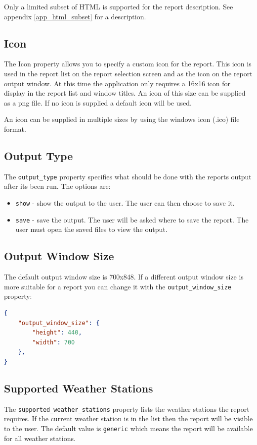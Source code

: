\documentclass[a4paper,10pt]{book}
\begin{document}
Only a limited subset of HTML is supported for the report description. See appendix \ref{app_html_subset} for a description.

\subsection{Icon}
The Icon property allows you to specify a custom icon for the report. This icon is used in the report list on the report selection screen and as the icon on the report output window. At this time the application only requires a 16x16 icon for display in the report list and window titles. An icon of this size can be supplied as a png file. If no icon is supplied a default icon will be used.

An icon can be supplied in multiple sizes by using the windows icon (.ico) file format.

\subsection{Output Type}
The \verb|output_type| property specifies what should be done with the reports output after its been run. The options are:
\begin{itemize}
\item \verb|show| - show the output to the user. The user can then choose to save it.
\item \verb|save| - save the output. The user will be asked where to save the report. The user must open the saved files to view the output.
\end{itemize}

\subsection{Output Window Size}
The default output window size is 700x848. If a different output window size is more suitable for a report you can change it with the \verb|output_window_size| property:

\begin{lstlisting}[language=json]
{
    "output_window_size": {
        "height": 440,
        "width": 700
    },
}
\end{lstlisting}

\subsection{Supported Weather Stations}
The \verb|supported_weather_stations| property lists the weather stations the report requires. If the current weather station is in the list then the report will be visible to the user. The default value is \verb|generic| which means the report will be available for all weather stations.
\end{document}
